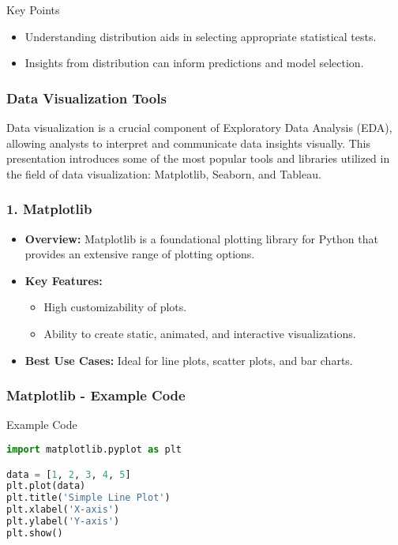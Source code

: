 \documentclass{beamer}
\begin{document}
\begin{frame}[fragile]
    \begin{block}{Key Points}
        \begin{itemize}
            \item Understanding distribution aids in selecting appropriate statistical tests.
            \item Insights from distribution can inform predictions and model selection.
        \end{itemize}
    \end{block}
\end{frame}

\begin{frame}
    \frametitle{Data Visualization Tools}
    Data visualization is a crucial component of Exploratory Data Analysis (EDA), allowing analysts to interpret and communicate data insights visually. This presentation introduces some of the most popular tools and libraries utilized in the field of data visualization: Matplotlib, Seaborn, and Tableau.
\end{frame}

\begin{frame}
    \frametitle{1. Matplotlib}
    \begin{itemize}
        \item \textbf{Overview:} 
        Matplotlib is a foundational plotting library for Python that provides an extensive range of plotting options.
        
        \item \textbf{Key Features:}
        \begin{itemize}
            \item High customizability of plots.
            \item Ability to create static, animated, and interactive visualizations.
        \end{itemize}
        
        \item \textbf{Best Use Cases:}
        Ideal for line plots, scatter plots, and bar charts.
    \end{itemize}
\end{frame}

\begin{frame}[fragile]
    \frametitle{Matplotlib - Example Code}
    \begin{block}{Example Code}
    \begin{lstlisting}[language=Python]
import matplotlib.pyplot as plt

data = [1, 2, 3, 4, 5]
plt.plot(data)
plt.title('Simple Line Plot')
plt.xlabel('X-axis')
plt.ylabel('Y-axis')
plt.show()
    \end{lstlisting}
    \end{block}
\end{frame}
\end{document}
